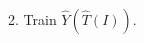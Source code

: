 \documentclass[preview]{standalone}
\begin{document}
\begin{center}
2. Train $\hat{Y}(\hat{T}(I))$.
\end{center}
\end{document}
